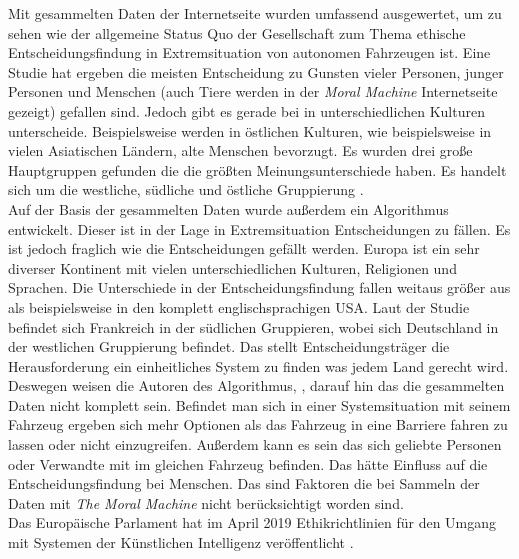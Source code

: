 Mit gesammelten Daten der Internetseite wurden umfassend ausgewertet, um zu sehen wie der allgemeine Status Quo der Gesellschaft zum Thema ethische Entscheidungsfindung in Extremsituation von autonomen Fahrzeugen ist. Eine Studie hat ergeben die meisten Entscheidung zu Gunsten vieler Personen, junger Personen und Menschen (auch Tiere werden in der \textit{Moral Machine} Internetseite gezeigt) gefallen sind. Jedoch gibt es gerade bei in unterschiedlichen Kulturen unterscheide. Beispielsweise werden in östlichen Kulturen, wie beispielsweise in vielen Asiatischen Ländern, alte Menschen bevorzugt. Es wurden drei große Hauptgruppen gefunden die die größten Meinungsunterschiede haben. Es handelt sich um die westliche, südliche und östliche Gruppierung \cite{moralMachine}.\\

Auf der Basis der gesammelten Daten wurde außerdem ein Algorithmus \cite{votingBasedSystem} entwickelt. Dieser ist in der Lage in Extremsituation Entscheidungen zu fällen. Es ist jedoch fraglich wie die Entscheidungen gefällt werden. Europa ist ein sehr diverser Kontinent mit vielen unterschiedlichen Kulturen, Religionen und Sprachen. Die Unterschiede in der Entscheidungsfindung fallen weitaus größer aus als beispielsweise in den komplett englischsprachigen USA. Laut der Studie befindet sich Frankreich in der südlichen Gruppieren, wobei sich Deutschland in der westlichen Gruppierung befindet. Das stellt Entscheidungsträger die Herausforderung ein einheitliches System zu finden was jedem Land gerecht wird.\\

Deswegen weisen die Autoren des Algorithmus, \citeauthor{votingBasedSystem}, darauf hin das die gesammelten Daten nicht komplett sein. Befindet man sich in einer Systemsituation mit seinem Fahrzeug ergeben sich mehr Optionen als das Fahrzeug in eine Barriere fahren zu lassen oder nicht einzugreifen. Außerdem kann es sein das sich geliebte Personen oder Verwandte mit im gleichen Fahrzeug befinden. Das hätte Einfluss auf die Entscheidungsfindung bei Menschen. Das sind Faktoren die bei Sammeln der Daten mit \textit{The Moral Machine} nicht berücksichtigt worden sind.\\


Das Europäische Parlament hat im April 2019 Ethikrichtlinien für den Umgang mit Systemen der Künstlichen Intelligenz veröffentlicht \cite{ec2019ethics}. 